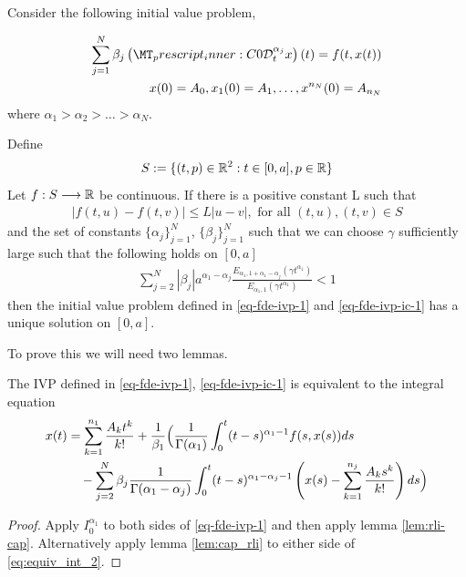 \begin{mdframed}[innertopmargin=10pt]
\begin{theorem}[Uniqueness]
\label{thm-existence-uniq}
Consider the following initial value problem,

	\begin{align}
		\label{eq-fde-ivp-1}
		\sum_{j=1}^{N} \beta_j\capder{0}{t}{\alpha_j}{x}(t) = f(t,x(t)) \\
		\label{eq-fde-ivp-ic-1}
		x(0) = A_0, x_1(0) = A_1, \ldots, x^{n_N}(0) = A_{n_N}
	\end{align}
	where $ \alpha_1 > \alpha_2 > \ldots > \alpha_N $.
	
	Define
		\begin{align*}
		 S:= \{ (t,p) \in \mathbb{R}^2 : t \in [0, a], p \in \mathbb{R} \} 
		\end{align*}
	Let $ f : S \longrightarrow \mathbb{R} $ be continuous. If there is a positive constant L such that 
		\begin{align}
		\label{eq:uniq-lipshitz}
		|f(t,u) - f(t,v)| \leq L|u-v|, \text{ for all } (t,u), (t,v) \in S
		\end{align}
and the set of constants $ \{ \alpha_j \}_{j = 1}^{N} $, $ \{ \beta_j \}_{j=1}^N $
such that we can choose $ \gamma $ sufficiently large such that the following holds on $ [0, a] $
	\begin{align}
	    \label{eq:fde-uniq-cond}
\sum_{j=2}^N |\beta_j| a^{\alpha_1 - \alpha_j} \frac{E_{\alpha_1,1+\alpha_1-\alpha_j}(\gamma t^{\alpha_1})}{E_{\alpha_1,1}(\gamma t^{\alpha_1})} < 1
	\end{align}
	then the initial value problem defined in \ref{eq-fde-ivp-1} and \ref{eq-fde-ivp-ic-1} has a unique solution on $ [0, a] $.
\end{theorem}
\end{mdframed}
To prove this we will need two lemmas. 
\begin{mdframed}[innertopmargin=10pt]
\begin{lemma}
	The IVP defined in \eqref{eq-fde-ivp-1}, \eqref{eq-fde-ivp-ic-1} is equivalent to the integral equation
	\begin{align}
		\label{eq:equiv_int_2}
		x(t) &= \sum_{k=1}^{n_1}\frac{A_kt^k}{k!} + \frac{1}{\beta_1} \Bigl( \frac{1}{\Gamma(\alpha_1)}\int_{0}^{t} (t-s)^{\alpha_1 - 1}f(s,x(s))ds \\
			& \ \ \ - \sum_{j=2}^{N}\beta_j \frac{1}{\Gamma(\alpha_1 - \alpha_j)}
			\int_{0}^{t}(t-s)^{\alpha_1 - \alpha_j - 1}\left(x(s) - \sum_{k=1}^{n_j}\frac{A_ks^k}{k!} \right) ds \Bigr)
	\end{align}
\end{lemma}
\end{mdframed}
\begin{proof}
	Apply $ I_0^{\alpha_1} $ to both sides of \eqref{eq-fde-ivp-1} and then apply lemma \ref{lem:rli-cap}. Alternatively apply lemma \ref{lem:cap_rli} to either side of \eqref{eq:equiv_int_2}. 
\end{proof}

